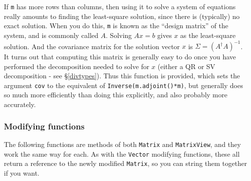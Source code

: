 \documentclass[twoside,letterpaper,11pt]{article}
\renewcommand{\tt}[1]{{\lstinline {#1}}}
\begin{document}
\begin{itemize}
If \tt{m} has more rows than columns, then using it to solve a system of equations
really amounts to finding the least-square solution, since there is (typically) no
exact solution.  When you do this, \tt{m} is known as the ``design matrix'' of the system,
and is commonly called $A$.  Solving $A x=b$ gives $x$ as the least-square 
solution.  And the covariance matrix for the solution vector $x$ is 
$\Sigma = (A^\dagger A)^{-1}$.
It turns out that computing this matrix is generally easy to do once you have 
performed the decomposition needed to solve for $x$ (either a QR or SV 
decomposition - see \S\ref{divtypes}).  
Thus this function is provided, which sets the
argument \tt{cov} to the equivalent of \tt{Inverse(m.adjoint()*m)}, 
but generally does so much more efficiently than doing this explicitly, 
and also probably more accurately.

\end{itemize}

\subsubsection{Modifying functions}

The following functions are methods of both \tt{Matrix} and \tt{MatrixView},
and they work the same way for each.
As with the \tt{Vector} modifying functions, these all return a reference
to the newly modified \tt{Matrix}, so you can string them together if you want.
\end{document}
